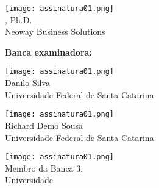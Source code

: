 \thispagestyle{empty}

\begin{center}
  \theauthor
\end{center}

\medskip
\begin{center}
  \textbf{\MakeUppercase{\thetitle}}
\end{center}

\medskip
{}



\begin{center}
	\texttt{[image: assinatura01.png]}\\
	\theadvisor, Ph.D.\\
	{\footnotesize Neoway Business Solutions}
\end{center}
\medskip
\textbf{Banca examinadora:}
\bigskip
\begin{center}
	\texttt{[image: assinatura01.png]}\\
	Danilo Silva\\
	{\footnotesize Universidade Federal de Santa Catarina}
\end{center}
\bigskip
\begin{center}
	\texttt{[image: assinatura01.png]}\\
	Richard Demo Sousa\\
	{\footnotesize Universidade Federal de Santa Catarina}
\end{center}
\bigskip
\begin{center}
	\texttt{[image: assinatura01.png]}\\
	Membro da Banca 3.\\
	{\footnotesize Universidade}
\end{center}
\medskip

\cleardoublepageempty
